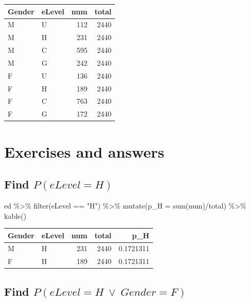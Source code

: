 \documentclass[
  letterpaper,
]{book}
\newenvironment{Shaded}{\begin{snugshade}}{\end{snugshade}}
\newcommand{\AttributeTok}[1]{\textcolor[rgb]{0.40,0.45,0.13}{#1}}
\newcommand{\FunctionTok}[1]{\textcolor[rgb]{0.28,0.35,0.67}{#1}}
\newcommand{\NormalTok}[1]{\textcolor[rgb]{0.00,0.23,0.31}{#1}}
\newcommand{\SpecialCharTok}[1]{\textcolor[rgb]{0.37,0.37,0.37}{#1}}
\newcommand{\StringTok}[1]{\textcolor[rgb]{0.13,0.47,0.30}{#1}}
\begin{document}
\begin{longtable}[]{@{}llrr@{}}
\toprule\noalign{}
Gender & eLevel & num & total \\
\midrule\noalign{}
\endhead
\bottomrule\noalign{}
\endlastfoot
M & U & 112 & 2440 \\
M & H & 231 & 2440 \\
M & C & 595 & 2440 \\
M & G & 242 & 2440 \\
F & U & 136 & 2440 \\
F & H & 189 & 2440 \\
F & C & 763 & 2440 \\
F & G & 172 & 2440 \\
\end{longtable}

\hypertarget{exercises-and-answers}{%
\section{Exercises and answers}\label{exercises-and-answers}}

\hypertarget{find-pelevel-h}{%
\subsection{\texorpdfstring{Find
\(P(eLevel = H)\)}{Find P(eLevel = H)}}\label{find-pelevel-h}}

\begin{Shaded}
\begin{Highlighting}[]
\NormalTok{ed }\SpecialCharTok{\%\textgreater{}\%}
  \FunctionTok{filter}\NormalTok{(eLevel }\SpecialCharTok{==} \StringTok{"H"}\NormalTok{) }\SpecialCharTok{\%\textgreater{}\%}
  \FunctionTok{mutate}\NormalTok{(}\AttributeTok{p\_H =} \FunctionTok{sum}\NormalTok{(num)}\SpecialCharTok{/}\NormalTok{total) }\SpecialCharTok{\%\textgreater{}\%}
  \FunctionTok{kable}\NormalTok{()}
\end{Highlighting}
\end{Shaded}

\begin{longtable}[]{@{}llrrr@{}}
\toprule\noalign{}
Gender & eLevel & num & total & p\_H \\
\midrule\noalign{}
\endhead
\bottomrule\noalign{}
\endlastfoot
M & H & 231 & 2440 & 0.1721311 \\
F & H & 189 & 2440 & 0.1721311 \\
\end{longtable}

\hypertarget{find-pelevel-h-vee-gender-f}{%
\subsection{\texorpdfstring{Find
\(P(eLevel = H\ \vee \ Gender = F)\)}{Find P(eLevel = H\textbackslash{} \textbackslash vee \textbackslash{} Gender = F)}}\label{find-pelevel-h-vee-gender-f}}
\end{document}
